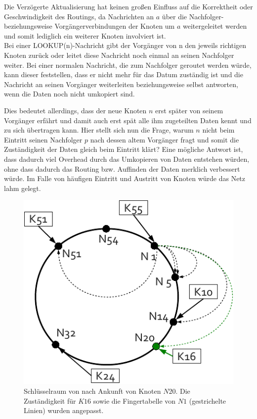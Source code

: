 Die Verzögerte Aktualisierung hat keinen großen Einfluss auf die Korrektheit oder Geschwindigkeit des Routings, da Nachrichten an $a$ über die Nachfolger- beziehungsweise Vorgängerverbindungen der Knoten um $a$ weitergeleitet werden und somit lediglich ein weiterer Knoten involviert ist.\\
Bei einer LOOKUP(n)-Nachricht gibt der Vorgänger von n den jeweils richtigen Knoten zurück oder leitet diese Nachricht noch einmal an seinen Nachfolger weiter. Bei einer normalen Nachricht, die zum Nachfolger geroutet werden würde, kann dieser feststellen, dass er nicht mehr für das Datum zuständig ist und die Nachricht an seinen Vorgänger weiterleiten beziehungsweise selbst antworten, wenn die Daten noch nicht umkopiert sind. 

Dies bedeutet allerdings, dass der neue Knoten $n$ erst später von seinem Vorgänger erfährt und damit auch erst spät alle ihm zugeteilten Daten kennt und zu sich übertragen kann. Hier stellt sich nun die Frage, warum $n$ nicht beim Eintritt seinen Nachfolger $p$ nach dessen altem Vorgänger fragt und somit die Zuständigkeit der Daten gleich beim Eintritt klärt? Eine mögliche Antwort ist, dass dadurch viel Overhead durch das Umkopieren von Daten entstehen würden, ohne dass dadurch das Routing bzw. Auffinden der Daten merklich verbessert würde. Im Falle von häufigen Eintritt und Austritt von Knoten würde das Netz lahm gelegt.

\begin{figure}[htb]
\centering
\includegraphics{grafics/chord_new_node.pdf}
\caption{Schlüsselraum von  nach Ankunft von Knoten $N20$. Die Zuständigkeit für $K16$ sowie die Fingertabelle von $N1$ (gestrichelte Linien) wurden angepasst.}
\label{fig:chord_new_node}
\end{figure}


